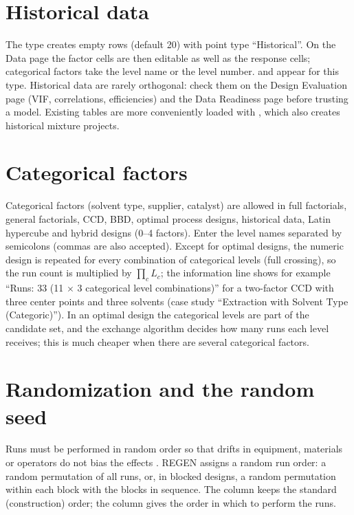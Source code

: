 \section{Historical data}
\label{sec:ch03-historical}
The type  creates  empty rows (default 20) with point type
``Historical''. On the Data page the factor cells are then editable as well as the response cells; categorical
factors take the level name or the level number.  and  appear for this type.
Historical data are rarely orthogonal: check them on the Design Evaluation page (VIF, correlations, efficiencies)
and the Data Readiness page before trusting a model. Existing tables are more conveniently loaded with
, which also creates historical mixture projects.

\section{Categorical factors}
\label{sec:ch03-categoric}
Categorical factors (solvent type, supplier, catalyst) are allowed in full factorials, general factorials, CCD,
BBD, optimal process designs, historical data, Latin hypercube and hybrid designs (0--4 factors). Enter the level
names separated by semicolons (commas are also accepted). Except for optimal designs, the numeric design is
repeated for every combination of categorical levels (full crossing), so the run count is multiplied by
$\prod_c L_c$; the information line shows for example ``Runs: 33 (11 $\times$ 3 categorical level combinations)''
for a two-factor CCD with three center points and three solvents (case study ``Extraction with Solvent Type
(Categoric)''). In an optimal design the categorical levels are part of the candidate set, and the exchange
algorithm decides how many runs each level receives; this is much cheaper when there are several categorical
factors.

\section{Randomization and the random seed}
\label{sec:ch03-random}
Runs must be performed in random order so that drifts in equipment, materials or operators do not bias the effects
\citep{montgomery2017}. REGEN assigns a random run order: a random permutation of all runs, or, in blocked designs,
a random permutation within each block with the blocks in sequence. The  column keeps the standard
(construction) order; the  column gives the order in which to perform the runs.

